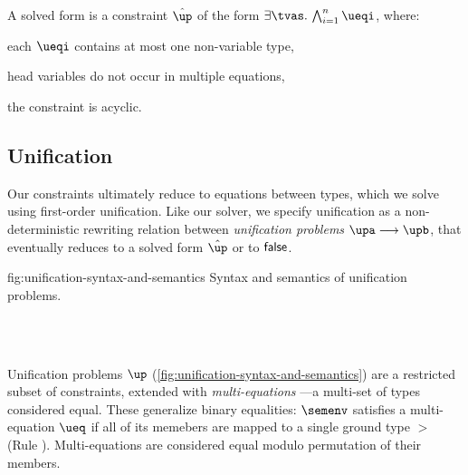 \documentclass[acmsmall,screen,nonacm,review]{acmart}
\begin{document}
\begin{definition}
  \label{def:solved-form}
  A solved form is a constraint $\hat\up$ of the form $\cexists \tvs \cAnd
\iton \ueqi$, where:
\begin{enumerate*}
  \item each $\ueqi$ contains at most one non-variable type,
  \item head variables do not occur in multiple equations,
  \item the constraint is acyclic.
\end{enumerate*}
\end{definition}

\subsection{Unification}
%
Our constraints ultimately reduce to equations between types, which we solve
using first-order unification. Like our solver, we specify unification as a
non-deterministic rewriting relation between \emph{unification problems} $\upa
\unif \upb$, that eventually reduces to a solved form $\hat\up$ or to $\mathsf{false}$.

\begin{mathparfig}[htpb!]
  {fig:unification-syntax-and-semantics}
  {Syntax and semantics of unification problems.
  }
\begin{minipage}[t]{0.45\textwidth}
\begin{bnfgrammar}
   \\
   \\
  \entry[Constraints]{\c}{
    \dots \and \ueq
  }
\end{bnfgrammar}
\end{minipage}
\hspace{0.3\textwidth}
\begin{minipage}[t]{0.45\textwidth}
    {\semenv \th \ueq}
\end{minipage}
\end{mathparfig}


Unification problems $\up$
(\cref{fig:unification-syntax-and-semantics}) are a restricted subset
of constraints, extended with \emph{multi-equations}
\citep{Pottier-Remy/emlti}---a multi-set of types considered
equal. These generalize binary equalities: $\semenv$ satisfies
a multi-equation $\ueq$ if all of its memebers are mapped to a single
ground type $\gt$ (Rule ). Multi-equations are
considered equal modulo permutation of their members.
\end{document}
